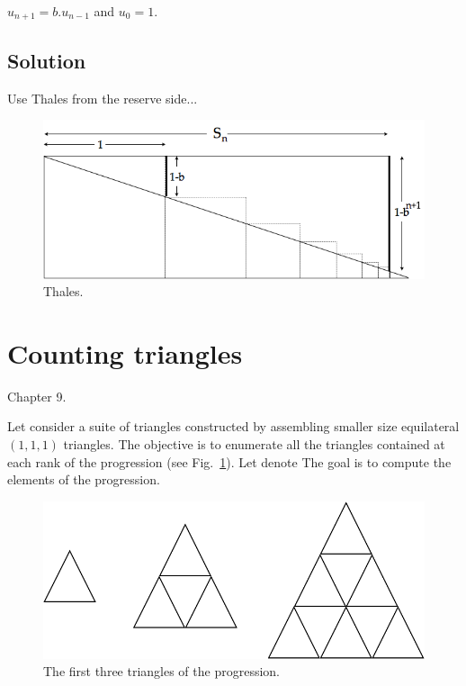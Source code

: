 \documentclass{article}[12pt]
\begin{document}
$u_{n+1} = b.u_{n−1}$ and $u_0 = 1$.

\subsection{Solution} 

Use Thales from the reserve side...
\begin{figure}[h]
\begin{center}
        \includegraphics[scale=0.4]{FiguresArithmetic/ThalesGeometricSumFinite} 
        \caption{Thales.}
\end{center}
\end{figure}



\section{Counting triangles}

Chapter 9.

Let consider a suite of triangles constructed by assembling smaller size equilateral $(1,1,1)$ triangles. 
The objective is to enumerate all the triangles contained at each rank of the progression
(see Fig.~\ref{fig:countingTriangles}). Let denote 
The goal is to compute the elements of the progression.
\begin{figure}[h]
\begin{center}
        \includegraphics[scale=0.4]{FiguresArithmetic/CountingTriangles} 
        \caption{The first three triangles of the progression.}
        \label{fig:countingTriangles}
\end{center}
\end{figure}
\end{document}

